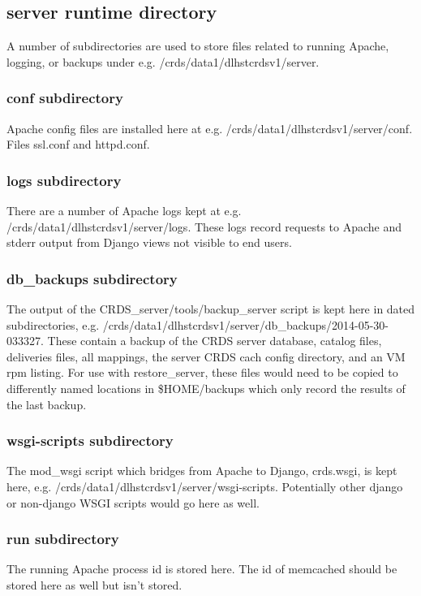 \documentclass[letterpaper,10pt,english]{sphinxmanual}
\begin{document}
\subsection{server runtime directory}
\label{server_guide:server-runtime-directory}
A number of subdirectories are used to store files related to running Apache, logging, or backups under
e.g. /crds/data1/dlhstcrdsv1/server.


\subsubsection{conf subdirectory}
\label{server_guide:conf-subdirectory}
Apache config files are installed here at e.g. /crds/data1/dlhstcrdsv1/server/conf.  Files ssl.conf and httpd.conf.


\subsubsection{logs subdirectory}
\label{server_guide:logs-subdirectory}
There are a number of Apache logs kept at e.g. /crds/data1/dlhstcrdsv1/server/logs.  These logs record requests to
Apache and stderr output from Django views not visible to end users.


\subsubsection{db\_backups subdirectory}
\label{server_guide:db-backups-subdirectory}
The output of the CRDS\_server/tools/backup\_server script is kept here in dated subdirectories,
e.g. /crds/data1/dlhstcrdsv1/server/db\_backups/2014-05-30-033327.  These contain a backup of the CRDS server database,
catalog files, deliveries files, all mappings, the server CRDS cach config directory, and an VM rpm listing.
For use with restore\_server,  these files would need to be copied to differently named locations in \$HOME/backups
which only record the results of the last backup.


\subsubsection{wsgi-scripts subdirectory}
\label{server_guide:wsgi-scripts-subdirectory}
The mod\_wsgi script which bridges from Apache to Django,  crds.wsgi,  is kept here,
e.g. /crds/data1/dlhstcrdsv1/server/wsgi-scripts.  Potentially other django or non-django WSGI scripts
would go here as well.


\subsubsection{run subdirectory}
\label{server_guide:run-subdirectory}
The running Apache process id is stored here.   The id of memcached should be stored here as well but isn't stored.
\end{document}
